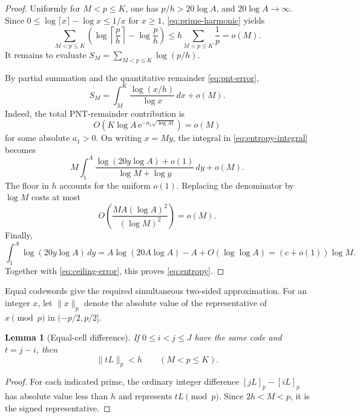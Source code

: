 \documentclass[11pt]{article}
\newtheorem{lemma}[theorem]{Lemma}
\theoremstyle{remark}
\newcommand{\e}{\mathrm e}
\begin{document}
\begin{proof}
Uniformly for \(M<p\leq K\), one has \(p/h>20\log A\), and
\(20\log A\to\infty\).  Since
\(0\leq\log\lceil x\rceil-\log x\leq1/x\) for \(x\geq1\),
\eqref{eq:prime-harmonic} yields
\begin{equation}\label{eq:ceiling-error}
 \sum_{M<p\leq K}
 \left(\log\left\lceil\frac ph\right\rceil-\log\frac ph\right)
 \leq h\sum_{M<p\leq K}\frac1p=o(M).
\end{equation}
It remains to evaluate
\(S_M=\sum_{M<p\leq K}\log(p/h)\).

By partial summation and the quantitative remainder
\eqref{eq:pnt-error},
\begin{equation}\label{eq:entropy-integral}
 S_M=\int_M^K\frac{\log(x/h)}{\log x}\,dx+o(M).
\end{equation}
Indeed, the total PNT-remainder contribution is
\[
 O\!\left(K\log A\,\e^{-a_1\sqrt{\log M}}\right)=o(M)
\]
for some absolute \(a_1>0\).  On writing \(x=My\), the integral in
\eqref{eq:entropy-integral} becomes
\begin{equation}\label{eq:entropy-scaled}
 M\int_1^A
 \frac{\log(20y\log A)+o(1)}{\log M+\log y}\,dy+o(M).
\end{equation}
The floor in \(h\) accounts for the uniform \(o(1)\).  Replacing the
denominator by \(\log M\) costs at most
\[
 O\!\left(\frac{MA(\log A)^2}{(\log M)^2}\right)=o(M).
\]
Finally,
\[
 \int_1^A\log(20y\log A)\,dy
 =A\log(20A\log A)-A+O(\log\log A)
 =(c+o(1))\log M.
\]
Together with \eqref{eq:ceiling-error}, this proves
\eqref{eq:entropy}.
\end{proof}

Equal codewords give the required simultaneous two-sided approximation.
For an integer \(x\), let \(\|x\|_p\) denote the absolute value of the
representative of \(x\pmod p\) in \((-p/2,p/2]\).

\begin{lemma}[Equal-cell difference]\label{lem:equal-cell}
If \(0\leq i<j\leq J\) have the same code and \(t=j-i\), then
\begin{equation}\label{eq:balanced}
 \|tL\|_p<h\qquad(M<p\leq K).
\end{equation}
\end{lemma}

\begin{proof}
For each indicated prime, the ordinary integer difference
\([jL]_p-[iL]_p\) has absolute value less than \(h\) and represents
\(tL\pmod p\).  Since \(2h<M<p\), it is the signed representative.
\end{proof}
\end{document}
